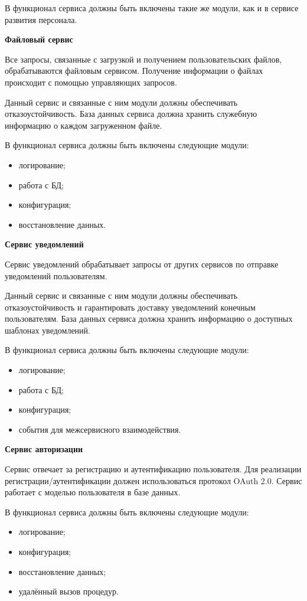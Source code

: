 В функционал сервиса должны быть включены такие же модули, как и в сервисе развития персонала.

\bigskip
\textbf{Файловый сервис}

Все запросы, связанные с загрузкой и получением пользовательских файлов, обрабатываются файловым сервисом. Получение информации о файлах происходит с помощью управляющих запросов.

Данный сервис и связанные с ним модули должны обеспечивать отказоустойчивость. База данных сервиса должна хранить служебную информацию о каждом загруженном файле.

В функционал сервиса должны быть включены следующие модули:
\begin{itemize}
    \item логирование;
    \item работа с БД;
    \item конфигурация;
    \item восстановление данных.
\end{itemize}

\bigskip
\textbf{Сервис уведомлений}

Сервис уведомлений обрабатывает запросы от других сервисов по отправке уведомлений пользователям.

Данный сервис и связанные с ним модули должны обеспечивать отказоустойчивость и гарантировать доставку уведомлений конечным пользователям. База данных сервиса должна хранить информацию о доступных шаблонах уведомлений.

В функционал сервиса должны быть включены следующие модули:
\begin{itemize}
    \item логирование;
    \item работа с БД;
    \item конфигурация;
    \item события для межсервисного взаимодействия.
\end{itemize}

\bigskip
\textbf{Сервис авторизации}

Сервис отвечает за регистрацию и аутентификацию пользователя. Для реализации регистрации/аутентификации должен использоваться протокол OAuth 2.0. Сервис работает с моделью пользователя в базе данных.

В функционал сервиса должны быть включены следующие модули:
\begin{itemize}
    \item логирование;
    \item конфигурация;
    \item восстановление данных;
    \item удалённый вызов процедур.
\end{itemize}

